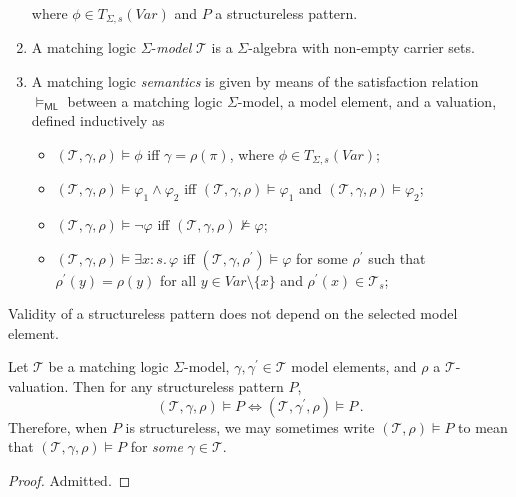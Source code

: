 \documentclass{article}
\newcommand{\ML}{\mathsf{ML}}
\begin{document}
\begin{definition}
\begin{enumerate}
          where $\phi \in T_{\Sigma, s}(\mathit{Var})$ and $P$ a structureless pattern.
    \item A matching logic $\Sigma$-\emph{model} $\mathcal{T}$ is a $\Sigma$-algebra with non-empty carrier sets.
    \item A matching logic \emph{semantics} is given by means of
          the satisfaction relation $\vDash_{\ML}$ between a matching logic $\Sigma$-model,
          a model element, and a valuation,
          defined inductively as
          \begin{itemize}
              \item $(\mathcal{T}, \gamma, \rho) \vDash \phi$ iff $\gamma = \rho(\pi)$, where $\phi \in T_{\Sigma, s}(\mathit{Var})$;
              \item $(\mathcal{T}, \gamma, \rho) \vDash \varphi_1 \land \varphi_2$ iff
                $(\mathcal{T}, \gamma, \rho) \vDash \varphi_1$ and
                $(\mathcal{T}, \gamma, \rho) \vDash \varphi_2$;
              \item $(\mathcal{T}, \gamma, \rho) \vDash \neg \varphi$ iff
                $(\mathcal{T}, \gamma, \rho) \not\vDash \varphi$;
              \item $(\mathcal{T}, \gamma, \rho) \vDash \exists x : s.\, \varphi$ iff
                $(\mathcal{T}, \gamma, \rho^\prime) \vDash \varphi$ for some $\rho^\prime$ such that
                $\rho^\prime(y) = \rho(y)$ for all $y \in \mathit{Var} \setminus \{ x \}$
                and $\rho^\prime(x) \in \mathcal{T}_s$;
          \end{itemize}
          
\end{enumerate}

\end{definition}

Validity of a structureless pattern does not depend on the selected model element.
\begin{lemma}\label{lem:structurelessSemantics}
Let $\mathcal{T}$ be a matching logic $\Sigma$-model, $\gamma,\gamma^\prime \in \mathcal{T}$ model elements,
and $\rho$ a $\mathcal{T}$-valuation. Then for any structureless pattern $P$,
\begin{equation*}
    (\mathcal{T}, \gamma, \rho) \vDash P \iff (\mathcal{T}, \gamma^\prime, \rho) \vDash P \, .
\end{equation*}
Therefore, when $P$ is structureless, we may sometimes write $(\mathcal{T}, \rho) \vDash P$ to mean that 
$(\mathcal{T}, \gamma, \rho) \vDash P$ for \emph{some} $\gamma \in \mathcal{T}$.
\end{lemma}
\begin{proof}
Admitted.
\end{proof}
\end{document}
